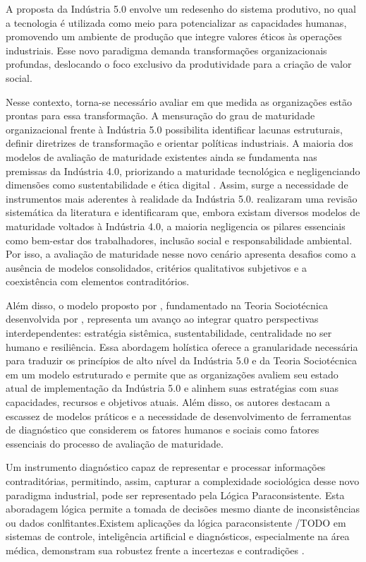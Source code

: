 A proposta da Indústria 5.0 envolve um redesenho do sistema produtivo, no qual a tecnologia é utilizada como meio para potencializar as capacidades humanas, promovendo um ambiente de produção que integre valores éticos às operações industriais.
Esse novo paradigma demanda transformações organizacionais profundas, deslocando o foco exclusivo da produtividade para a criação de valor social. %

Nesse contexto, torna-se necessário avaliar em que medida as organizações estão prontas para essa transformação.
A mensuração do grau de maturidade organizacional frente à Indústria 5.0 possibilita identificar lacunas estruturais, definir diretrizes de transformação e orientar políticas industriais.
A maioria dos modelos de avaliação de maturidade existentes ainda se fundamenta nas premissas da Indústria 4.0, priorizando a maturidade tecnológica e negligenciando dimensões como sustentabilidade e ética digital \cite{Lucato2019,HeinPensel2023}.
Assim, surge a necessidade de instrumentos mais aderentes à realidade da Indústria 5.0.
 realizaram uma revisão sistemática da literatura e identificaram que, embora existam diversos modelos de maturidade voltados à Indústria 4.0, a maioria negligencia os pilares essenciais como bem-estar dos trabalhadores, inclusão social e responsabilidade ambiental.
Por isso, a avaliação de maturidade nesse novo cenário apresenta desafios como a ausência de modelos consolidados, critérios qualitativos subjetivos e a coexistência com elementos contraditórios.

Além disso, o modelo proposto por , fundamentado na Teoria Sociotécnica desenvolvida por , representa um avanço ao integrar quatro perspectivas interdependentes: estratégia sistêmica, sustentabilidade, centralidade no ser humano e resiliência.
Essa abordagem holística oferece a granularidade necessária para traduzir os princípios de alto nível da Indústria 5.0 e da Teoria Sociotécnica em um modelo estruturado e permite que as organizações avaliem seu estado atual de implementação da Indústria 5.0 e alinhem suas estratégias com suas capacidades, recursos e objetivos atuais.
Além disso, os autores destacam a escassez de modelos práticos e a necessidade de desenvolvimento de ferramentas de diagnóstico que considerem os fatores humanos e sociais como fatores essenciais do processo de avaliação de maturidade.

Um instrumento diagnóstico capaz de representar e processar informações contraditórias, permitindo, assim, capturar a complexidade sociológica desse novo paradigma industrial, pode ser representado pela Lógica Paraconsistente.
Esta aboradagem lógica permite a tomada de decisões mesmo diante de inconsistências ou dados conlfitantes.Existem aplicações da lógica paraconsistente /TODO em sistemas de controle, inteligência artificial e diagnósticos, especialmente na área médica, demonstram sua robustez frente a incertezas e contradições \cite{SilvaFilho1999, CarvalhoBrunsteinAbe2003, CarvalhoJunior2024}.

